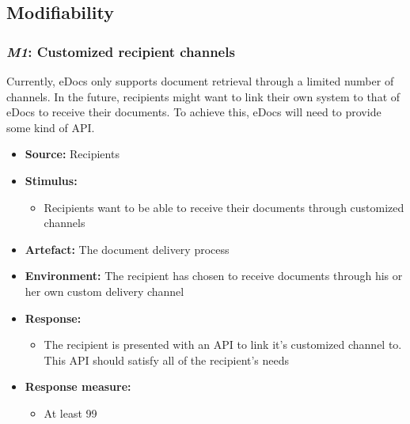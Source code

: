 \documentclass[a4paper,10pt]{article}
\begin{document}
\subsection{Modifiability}
\subsubsection{\emph{M1}: Customized recipient channels}
Currently, eDocs only supports document retrieval through a limited number of channels. In the future, recipients might want to link their own system to that of eDocs to receive their documents. To achieve this, eDocs will need to provide some kind of API.

\begin{itemize}
    \item \textbf{Source:} Recipients
    \item \textbf{Stimulus:}
        \begin{itemize}
            \item Recipients want to be able to receive their documents through customized channels
        \end{itemize}

    \item \textbf{Artefact:} The document delivery process
    \item \textbf{Environment:} The recipient has chosen to receive documents through his or her own custom delivery channel
    \item \textbf{Response:}
        \begin{itemize}
            \item The recipient is presented with an API to link it's customized channel to. This API should satisfy all of the recipient's needs
        \end{itemize}

    \item \textbf{Response measure:}
        \begin{itemize}
            \item At least 99%
        \end{itemize}
\end{itemize}
\end{document}
